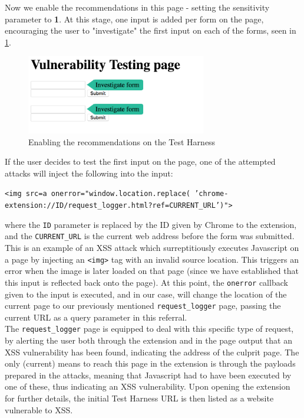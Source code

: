 Now we enable the recommendations in this page - setting the sensitivity parameter to \textbf{1}. At this stage, one input is added per form on the page, encouraging the user to "investigate" the first input on each of the forms, seen in \ref{fig:test_harness_recommendations_2}. 

\begin{figure}[h]
	\centering
	\includegraphics[width=0.7\textwidth]{images/test_harness_recommendations_2.png}
	\caption{Enabling the recommendations on the Test Harness}
	\label{fig:test_harness_recommendations_2}
\end{figure}

If the user decides to test the first input on the page, one of the attempted attacks will inject the following into the input:

\begin{center}
	\texttt{<img src=a onerror="window.location.replace( 'chrome-extension://ID/request\_logger.html?ref=CURRENT\_URL')">}
\end{center}

where the \texttt{ID} parameter is replaced by the ID given by Chrome to the extension, and the \texttt{CURRENT\_URL} is the current web address before the form was submitted. This is an example of an XSS attack which surreptitiously executes Javascript on a page by injecting an \texttt{<img>} tag with an invalid source location. This triggers an error when the image is later loaded on that page (since we have established that this input is reflected back onto the page). At this point, the \texttt{onerror} callback given to the input is executed, and in our case, will change the location of the current page to our previously mentioned \texttt{request\_logger} page, passing the current URL as a query parameter in this referral. \\


The \texttt{request\_logger} page is equipped to deal with this specific type of request, by alerting the user both through the extension and in the page output that an XSS vulnerability has been found, indicating the address of the culprit page. The only (current) means to reach this page in the extension is through the payloads prepared in the attacks, meaning that Javascript had to have been executed by one of these, thus indicating an XSS vulnerability. Upon opening the extension for further details, the initial Test Harness URL is then listed as a website vulnerable to XSS. \\


